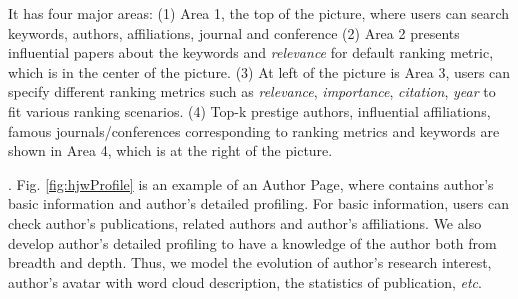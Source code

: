 \par
It has four major areas: (1) Area 1, the top of the picture, where users can search keywords, authors, affiliations, journal and conference (2) Area 2 presents influential papers about the keywords and {\em relevance} for default ranking metric, which is in the center of the picture. (3) At left of the picture is Area 3, users can specify different ranking metrics such as {\em relevance}, {\em importance}, {\em citation}, {\em year} to fit various ranking scenarios. (4) Top-k prestige authors, influential affiliations, famous journals/conferences corresponding to ranking metrics and keywords are shown in Area 4, which is at the right of the picture.


\par
{}. Fig. \ref{fig:hjwProfile} is an example of an Author Page, where contains author's basic information and author's detailed profiling. For basic information, users can check author's publications, related authors and author's affiliations. We also develop author's detailed profiling to have a knowledge of the author both from breadth and depth. Thus, we model the evolution of author's research interest, author's avatar with word cloud description, the statistics of publication, {\em etc}.


